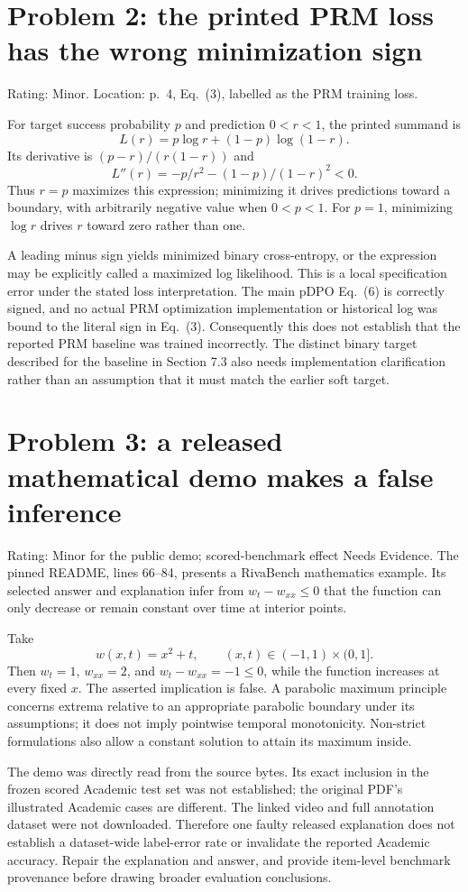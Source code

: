 \documentclass[10pt]{article}
\begin{document}
\section*{Problem 2: the printed PRM loss has the wrong minimization sign}
Rating: Minor. Location: p. 4, Eq. (3), labelled as the PRM training loss.\par
For target success probability \(p\) and prediction \(0<r<1\), the printed summand is \[L(r)=p\log r+(1-p)\log(1-r).\] Its derivative is \((p-r)/(r(1-r))\) and \[L''(r)=-p/r^2-(1-p)/(1-r)^2<0.\] Thus \(r=p\) maximizes this expression; minimizing it drives predictions toward a boundary, with arbitrarily negative value when \(0<p<1\). For \(p=1\), minimizing \(\log r\) drives \(r\) toward zero rather than one.\par
A leading minus sign yields minimized binary cross-entropy, or the expression may be explicitly called a maximized log likelihood. This is a local specification error under the stated loss interpretation. The main pDPO Eq. (6) is correctly signed, and no actual PRM optimization implementation or historical log was bound to the literal sign in Eq. (3). Consequently this does not establish that the reported PRM baseline was trained incorrectly. The distinct binary target described for the baseline in Section 7.3 also needs implementation clarification rather than an assumption that it must match the earlier soft target.\par
\section*{Problem 3: a released mathematical demo makes a false inference}
Rating: Minor for the public demo; scored-benchmark effect Needs Evidence. The pinned README, lines 66–84, presents a RivaBench mathematics example. Its selected answer and explanation infer from \(w_t-w_{xx}\le0\) that the function can only decrease or remain constant over time at interior points.\par
Take \[w(x,t)=x^2+t,\qquad (x,t)\in(-1,1)\times(0,1].\] Then \(w_t=1\), \(w_{xx}=2\), and \(w_t-w_{xx}=-1\le0\), while the function increases at every fixed \(x\). The asserted implication is false. A parabolic maximum principle concerns extrema relative to an appropriate parabolic boundary under its assumptions; it does not imply pointwise temporal monotonicity. Non-strict formulations also allow a constant solution to attain its maximum inside.\par
The demo was directly read from the source bytes. Its exact inclusion in the frozen scored Academic test set was not established; the original PDF’s illustrated Academic cases are different. The linked video and full annotation dataset were not downloaded. Therefore one faulty released explanation does not establish a dataset-wide label-error rate or invalidate the reported Academic accuracy. Repair the explanation and answer, and provide item-level benchmark provenance before drawing broader evaluation conclusions.\par
\end{document}
